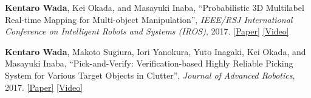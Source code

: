 \documentclass[letterpaper,MMMyyyy,nonstop]{simpleresumecv}
\begin{document}
\begin{body}
\GapNoBreak

\textbf{Kentaro Wada}, Kei Okada, and Masayuki Inaba,
``Probabilistic 3D Multilabel Real-time Mapping for Multi-object Manipulation'',
\textit{IEEE/RSJ International Conference on Intelligent Robots and Systems (IROS)}, 2017.
\href{https://arxiv.org/abs/2001.05752}{\underline{[Paper]}}
\href{https://www.youtube.com/watch?v=T-vtVQT9sgc}{\underline{[Video]}}


\GapNoBreak

\textbf{Kentaro Wada}, Makoto Sugiura, Iori Yanokura, Yuto Inagaki, Kei Okada, and Masayuki Inaba,
``Pick-and-Verify: Verification-based Highly Reliable Picking System for Various Target Objects in Clutter'',
\textit{Journal of Advanced Robotics}, 2017.
\href{http://www.tandfonline.com/doi/abs/10.1080/01691864.2016.1269672?journalCode=tadr20}{\underline{[Paper]}}
\href{http://www.tandfonline.com/doi/suppl/10.1080/01691864.2016.1269672?scroll=top}{\underline{[Video]}}


\end{body}
\end{document}
